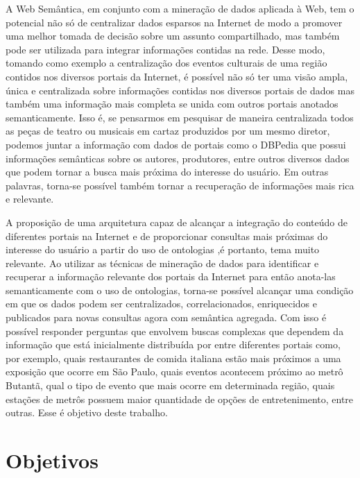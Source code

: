 A Web Semântica, em conjunto com a mineração de dados aplicada à Web, tem o potencial não só de centralizar dados esparsos na Internet de modo a promover uma melhor tomada de decisão sobre um assunto compartilhado, mas também pode ser utilizada para integrar informações contidas na rede. Desse modo, tomando como exemplo a centralização dos eventos culturais de uma região contidos nos diversos portais da Internet, é possível não só ter uma visão ampla, única e centralizada sobre informações contidas nos diversos portais de dados mas também uma informação mais completa se unida com outros portais anotados semanticamente. Isso é, se pensarmos em pesquisar de maneira centralizada todos as peças de teatro ou musicais em cartaz produzidos por um mesmo diretor, podemos juntar a informação com dados de portais como o DBPedia que possui informações semânticas sobre os autores, produtores, entre outros diversos dados que podem tornar a busca mais próxima do interesse do usuário. Em outras palavras, torna-se possível também tornar a recuperação de informações mais rica e relevante.

A proposição de uma arquitetura capaz de alcançar a integração do conteúdo de diferentes portais na Internet e de proporcionar consultas mais próximas do interesse do usuário a partir do uso de ontologias ,é portanto, tema muito relevante. Ao utilizar as técnicas de mineração de dados para identificar e recuperar a informação relevante dos portais da Internet para então anota-las semanticamente com o uso de ontologias, torna-se possível alcançar uma condição em que os dados podem ser centralizados, correlacionados, enriquecidos e publicados para novas consultas agora com semântica agregada. Com isso é possível responder perguntas que envolvem buscas complexas que dependem da informação que está inicialmente distribuída por entre diferentes portais como, por exemplo, quais restaurantes de comida italiana estão mais próximos a uma exposição que ocorre em São Paulo, quais eventos acontecem próximo ao metrô Butantã, qual o tipo de evento que mais ocorre em determinada região, quais estações de metrôs possuem maior quantidade de opções de entretenimento, entre outras. Esse é objetivo deste trabalho.

\section{Objetivos}
\label{sec:objetivos}

